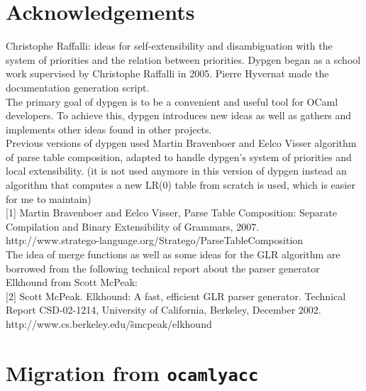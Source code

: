 \documentclass[12pt]{article}
\begin{document}
{\appendix

\section{Acknowledgements}

Christophe Raffalli: ideas for self-extensibility and disambiguation with the system of priorities and the relation between priorities. Dypgen began as a school work supervised by Christophe Raffalli in 2005. Pierre Hyvernat made the documentation generation script.\\

The primary goal of dypgen is to be a convenient and useful tool for OCaml developers. To achieve this, dypgen introduces new ideas as well as gathers and implements other ideas found in other projects.\\

Previous versions of dypgen used Martin Bravenboer and Eelco Visser algorithm of parse table composition, adapted to handle dypgen's system of priorities and local extensibility. (it is not used anymore in this version of dypgen instead an algorithm that computes a new LR(0) table from scratch is used, which is easier for me to maintain)\\

[1] Martin Bravenboer and Eelco Visser, Parse Table Composition: Separate Compilation and Binary Extensibility of Grammars, 2007.\\

http://www.stratego-language.org/Stratego/ParseTableComposition\\

The idea of merge functions as well as some ideas for the GLR algorithm are borrowed from the following technical report about the parser generator Elkhound from Scott McPeak:\\

[2] Scott McPeak. Elkhound: A fast, efficient GLR parser generator. Technical Report CSD-02-1214, University of California, Berkeley, December 2002.\\

http://www.cs.berkeley.edu/\~smcpeak/elkhound\\

\section{Migration from \texttt{ocamlyacc}}

}
\end{document}

